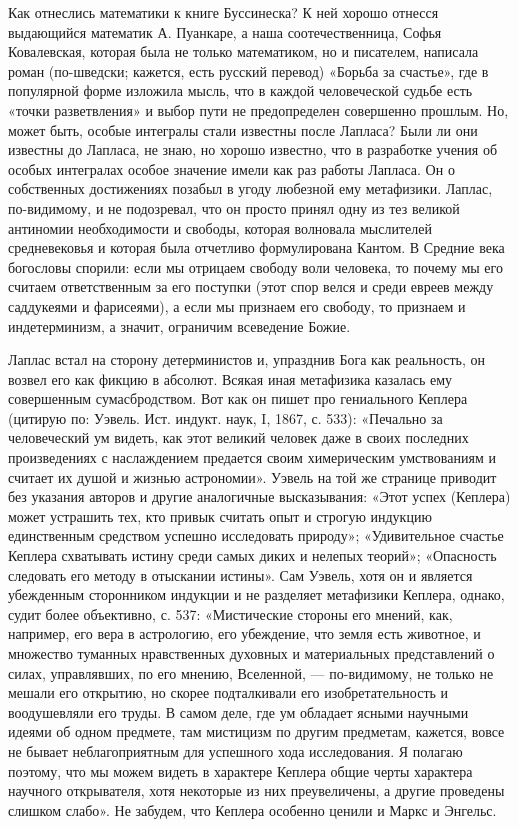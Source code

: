 Как отнеслись математики к книге Буссинеска? К ней хорошо отнесся
выдающийся математик А. Пуанкаре, а наша соотечественница, Софья
Ковалевская, которая была не только математиком, но и писателем, написала
роман (по-шведски; кажется, есть русский перевод) «Борьба за счастье», где в
популярной форме изложила мысль, что в каждой человеческой судьбе есть
«точки разветвления» и выбор пути не предопределен совершенно прошлым. Но,
может быть, особые интегралы стали известны после Лапласа? Были ли они
известны до Лапласа, не знаю, но хорошо известно, что в разработке учения об
особых интегралах особое значение имели как раз работы Лапласа. Он о
собственных достижениях позабыл в угоду любезной ему метафизики. Лаплас,
по-видимому, и не подозревал, что он просто принял одну из тез великой
антиномии необходимости и свободы, которая волновала мыслителей
средневековья и которая была отчетливо формулирована Кантом. В Средние века
богословы спорили: если мы отрицаем свободу воли человека, то почему мы его
считаем ответственным за его поступки (этот спор велся и среди евреев между
саддукеями и фарисеями), а если мы признаем его свободу, то признаем и
индетерминизм, а значит, ограничим всеведение Божие.

Лаплас встал на сторону детерминистов и, упразднив Бога как реальность, он
возвел его как фикцию в абсолют. Всякая иная метафизика казалась ему
совершенным сумасбродством. Вот как он пишет про гениального Кеплера
(цитирую по: Уэвель. Ист. индукт. наук, I, 1867, с. 533): «Печально за
человеческий ум видеть, как этот великий человек даже в своих последних
произведениях с наслаждением предается своим химерическим умствованиям и
считает их душой и жизнью астрономии». Уэвель на той же странице приводит без
указания авторов и другие аналогичные высказывания: «Этот успех (Кеплера)
может устрашить тех, кто привык считать опыт и строгую индукцию
единственным средством успешно исследовать природу»; «Удивительное счастье
Кеплера схватывать истину среди самых диких и нелепых теорий»; «Опасность
следовать его методу в отыскании истины». Сам Уэвель, хотя он и является
убежденным сторонником индукции и не разделяет метафизики Кеплера, однако,
судит более объективно, с. 537: «Мистические стороны его мнений, как,
например, его вера в астрологию, его убеждение, что земля есть животное, и
множество туманных нравственных духовных и материальных представлений о
силах, управлявших, по его мнению, Вселенной, --- по-видимому, не только не
мешали его открытию, но скорее подталкивали его изобретательность и
воодушевляли его труды. В самом деле, где ум обладает ясными научными
идеями об одном предмете, там мистицизм по другим предметам, кажется, вовсе не
бывает неблагоприятным для успешного хода исследования. Я полагаю поэтому, что
мы можем видеть в характере Кеплера общие черты характера научного
открывателя, хотя некоторые из них преувеличены, а другие проведены слишком
слабо». Не забудем, что Кеплера особенно ценили и Маркс и Энгельс.

